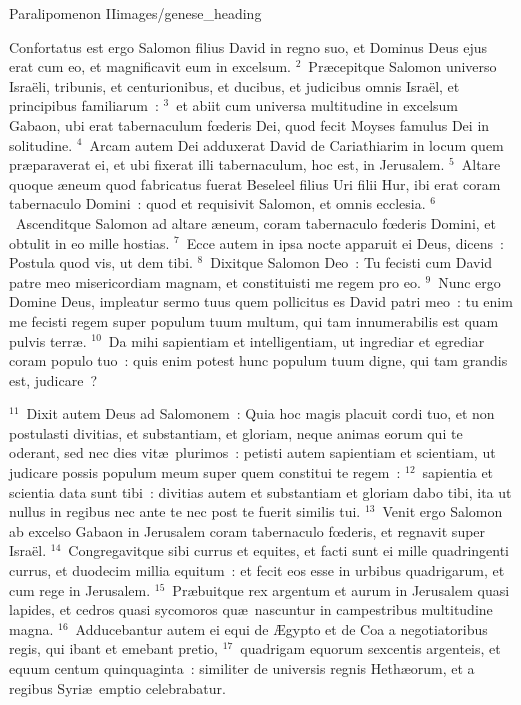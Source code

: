 {Paralipomenon II}{images/genese_heading}


\lettrine[lines=10,image=true,loversize=0.05,lraise=-0.03]{C}{}onfortatus est ergo Salomon filius David in regno suo, et Dominus Deus ejus erat cum eo, et magnificavit eum in excelsum.
${}^{2}$~Pr\ae cepitque Salomon universo Isra\"eli, tribunis, et centurionibus, et ducibus, et judicibus omnis Isra\"el, et principibus familiarum~:
${}^{3}$~et abiit cum universa multitudine in excelsum Gabaon, ubi erat tabernaculum fœderis Dei, quod fecit Moyses famulus Dei in solitudine.
${}^{4}$~Arcam autem Dei adduxerat David de Cariathiarim in locum quem pr\ae paraverat ei, et ubi fixerat illi tabernaculum, hoc est, in Jerusalem.
${}^{5}$~Altare quoque \ae neum quod fabricatus fuerat Beseleel filius Uri filii Hur, ibi erat coram tabernaculo Domini~: quod et requisivit Salomon, et omnis ecclesia.
${}^{6}$~Ascenditque Salomon ad altare \ae neum, coram tabernaculo fœderis Domini, et obtulit in eo mille hostias.
${}^{7}$~Ecce autem in ipsa nocte apparuit ei Deus, dicens~: Postula quod vis, ut dem tibi.
${}^{8}$~Dixitque Salomon Deo~: Tu fecisti cum David patre meo misericordiam magnam, et constituisti me regem pro eo.
${}^{9}$~Nunc ergo Domine Deus, impleatur sermo tuus quem pollicitus es David patri meo~: tu enim me fecisti regem super populum tuum multum, qui tam innumerabilis est quam pulvis terr\ae .
${}^{10}$~Da mihi sapientiam et intelligentiam, ut ingrediar et egrediar coram populo tuo~: quis enim potest hunc populum tuum digne, qui tam grandis est, judicare~?


${}^{11}$~Dixit autem Deus ad Salomonem~: Quia hoc magis placuit cordi tuo, et non postulasti divitias, et substantiam, et gloriam, neque animas eorum qui te oderant, sed nec dies vit\ae\ plurimos~: petisti autem sapientiam et scientiam, ut judicare possis populum meum super quem constitui te regem~:
${}^{12}$~sapientia et scientia data sunt tibi~: divitias autem et substantiam et gloriam dabo tibi, ita ut nullus in regibus nec ante te nec post te fuerit similis tui.
${}^{13}$~Venit ergo Salomon ab excelso Gabaon in Jerusalem coram tabernaculo fœderis, et regnavit super Isra\"el.
${}^{14}$~Congregavitque sibi currus et equites, et facti sunt ei mille quadringenti currus, et duodecim millia equitum~: et fecit eos esse in urbibus quadrigarum, et cum rege in Jerusalem.
${}^{15}$~Pr\ae buitque rex argentum et aurum in Jerusalem quasi lapides, et cedros quasi sycomoros qu\ae\ nascuntur in campestribus multitudine magna.
${}^{16}$~Adducebantur autem ei equi de \AE gypto et de Coa a negotiatoribus regis, qui ibant et emebant pretio,
${}^{17}$~quadrigam equorum sexcentis argenteis, et equum centum quinquaginta~: similiter de universis regnis Heth\ae orum, et a regibus Syri\ae\ emptio celebrabatur.

